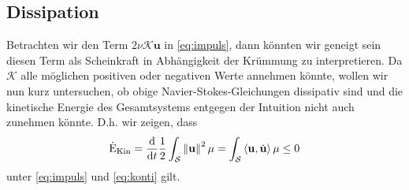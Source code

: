 \documentclass[a4paper,11pt]{scrartcl}
\newcommand{\U}{u} %
\newcommand{\Ub}{\mathbf{\U}} %
\newcommand{\gauss}{\mathcal{K}} %
\newcommand{\dtekin}{\dot{\textup{E}}_{\textup{Kin}}} %
\newcommand{\surf}{\mathcal{S}} %
\begin{document}
\subsection{Dissipation}
  Betrachten wir den Term \( 2\nu\gauss\Ub \) in \eqref{eq:impuls}, dann könnten wir geneigt sein diesen Term als Scheinkraft in Abhängigkeit der Krümmung zu interpretieren.
  Da \( \gauss \) alle möglichen positiven oder negativen Werte annehmen könnte, wollen wir nun kurz untersuchen, ob obige Navier-Stokes-Gleichungen dissipativ sind
  und die kinetische Energie des Gesamtsystems entgegen der Intuition nicht auch zunehmen könnte.
  D.h. wir zeigen, dass
  \begin{align}
    \dtekin = \frac{\textup{d}}{\textup{d}t} \frac{1}{2} \int_{\surf} \left\| \Ub \right\|^{2}\mu
                = \int_{\surf} \left\langle \Ub , \dot{\Ub} \right\rangle \mu
                \le 0
  \end{align}
  unter \eqref{eq:impuls} und \eqref{eq:konti} gilt.
\end{document}
